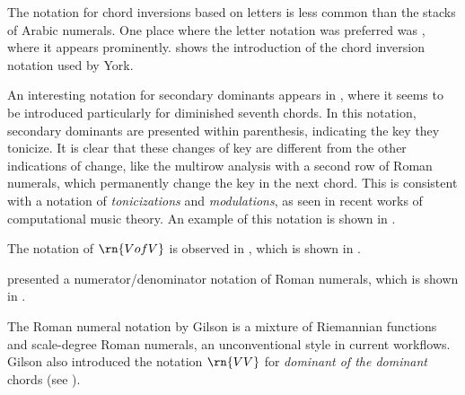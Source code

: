 The notation for chord inversions based on letters is less
common than the stacks of Arabic numerals. One place where
the letter notation was preferred was
\textcite{york1909practical}, where it appears prominently.
 shows the
introduction of the chord inversion notation used by York.


An interesting notation for secondary dominants appears in
\textcite{white1911harmonic}, where it seems to be
introduced particularly for diminished seventh chords. In
this notation, secondary dominants are presented within
parenthesis, indicating the key they tonicize. It is clear
that these changes of key are different from the other
indications of change, like the multirow analysis with a
second row of Roman numerals, which permanently change the
key in the next chord. This is consistent with a notation of
\emph{tonicizations} and \emph{modulations}, as seen in
recent works of computational music theory. An example of
this notation is shown in
.


The notation of $\rn{V of V}$ is observed in
\textcite{mokrejs1913lessons}, which is shown in
.


\textcite{gilson1919traite} presented a
numerator/denominator notation of Roman numerals, which is
shown in .



The Roman numeral notation by Gilson is a mixture of
Riemannian functions and scale-degree Roman numerals, an
unconventional style in current workflows. Gilson also
introduced the notation $\rn{VV}$ for \emph{dominant of the
dominant} chords (see
).

